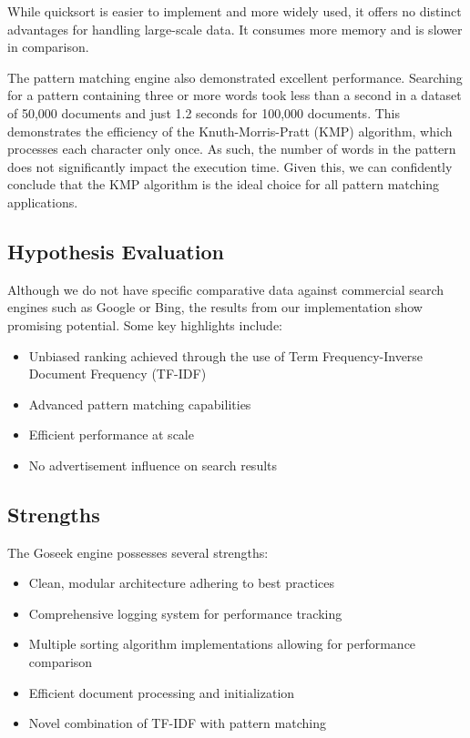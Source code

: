 While quicksort is easier to implement and more widely used, it offers no distinct advantages for handling large-scale data. It consumes more memory and is slower in comparison.

The pattern matching engine also demonstrated excellent performance. Searching for a pattern containing three or more words took less than a second in a dataset of 50,000 documents and just 1.2 seconds for 100,000 documents. This demonstrates the efficiency of the Knuth-Morris-Pratt (KMP) algorithm, which processes each character only once. As such, the number of words in the pattern does not significantly impact the execution time. Given this, we can confidently conclude that the KMP algorithm is the ideal choice for all pattern matching applications.

\subsection{Hypothesis Evaluation}

Although we do not have specific comparative data against commercial search engines such as Google or Bing, the results from our implementation show promising potential. Some key highlights include:

\begin{itemize}
    \item Unbiased ranking achieved through the use of Term Frequency-Inverse Document Frequency (TF-IDF)
    \item Advanced pattern matching capabilities
    \item Efficient performance at scale
    \item No advertisement influence on search results
\end{itemize}

\subsection{Strengths}

The Goseek engine possesses several strengths:

\begin{itemize}
    \item Clean, modular architecture adhering to best practices
    \item Comprehensive logging system for performance tracking
    \item Multiple sorting algorithm implementations allowing for performance comparison
    \item Efficient document processing and initialization
    \item Novel combination of TF-IDF with pattern matching
\end{itemize}

